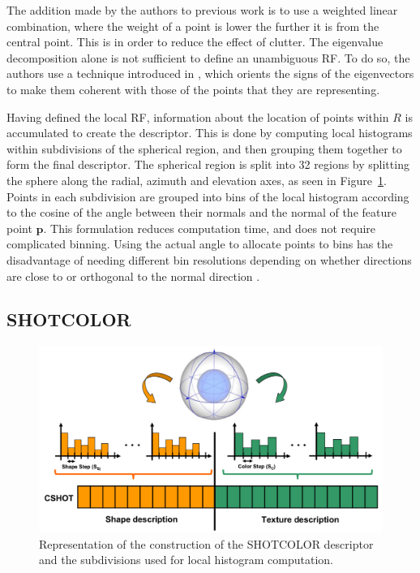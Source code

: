 \documentclass[11pt,a4paper]{kth-mag}
\begin{document}
The addition made by the authors to previous work is to use a weighted linear
combination, where the weight of a point is lower the further it is from the
central point. This is in order to reduce the effect of clutter. The eigenvalue
decomposition alone is not sufficient to define an unambiguous RF. To do so, the
authors use a technique introduced in \cite{bro2008resolving}, which orients the
signs of the eigenvectors to make them coherent with those of the points that
they are representing.

Having defined the local RF, information about the location of points within $R$
is accumulated to create the descriptor. This is done by computing local
histograms within subdivisions of the spherical region, and then grouping them
together to form the final descriptor. The spherical region is split into 32
regions by splitting the sphere along the radial, azimuth and elevation axes, as
seen in Figure~\ref{fig:shotcolor}. Points in each subdivision are grouped into
bins of the local histogram according to the cosine of the angle between their
normals and the normal of the feature point $\mathbf{p}$. This formulation
reduces computation time, and does not require complicated binning. Using the
actual angle to allocate points to bins has the disadvantage of needing
different bin resolutions depending on whether directions are close to or
orthogonal to the normal direction \cite{tombari2010unique}.
\subsection{SHOTCOLOR}
\begin{figure}
  \centering
  \includegraphics[width=\textwidth]{images/shotcolor}
  \caption{Representation of the construction of the SHOTCOLOR descriptor and
    the subdivisions used for local histogram computation.}
  \label{fig:shotcolor}
\end{figure}
\end{document}
